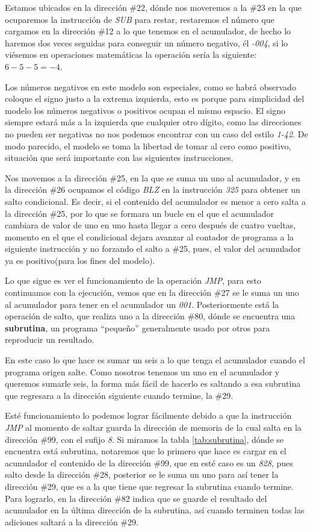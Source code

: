 \documentclass[letterpaper,12pt,oneside]{book}
\begin{document}
	Estamos ubicados en la dirección \#22, dónde nos moveremos a la \#23 en la que ocuparemos la instrucción de \textit{SUB} para restar, restaremos el 
	número que cargamos en la dirección \#12 a lo que tenemos en el acumulador, de hecho lo haremos dos veces seguidas para conseguir un número 	
	negativo, él \textit{-004}, si lo viésemos en operaciones matemáticas la operación sería la siguiente: $ 6-5-5 = -4 $.
 
    Los números negativos en este modelo son especiales, 
	como se habrá observado coloque el signo
	justo a la extrema izquierda, esto es porque para simplicidad del modelo los números negativos
	o positivos ocupan el mismo espacio. El signo siempre estará más a la izquierda que cualquier otro dígito, como las direcciones
	no pueden ser negativas no nos podemos encontrar con un caso del estilo \textit{1-42}. De modo
	parecido, el modelo se toma la libertad de tomar al cero como positivo, situación que será importante con las siguientes instrucciones.
	
	Nos	movemos a la dirección \#25, en la que se suma un uno al acumulador, y en la dirección \#26 ocupamos el código 
	\textit{BLZ} en la instrucción \textit{325} para obtener un salto condicional. Es decir, si el contenido del acumulador es menor a cero salta a la 
	dirección \#25, por lo que se formara
	un bucle en el que el acumulador cambiara de valor de uno en uno hasta llegar a cero después de cuatro vueltas, momento en el que el condicional 
	dejara avanzar al contador de programa a la siguiente instrucción y no forzando el salto a \#25, pues, el valor del acumulador ya es
	positivo(para los fines del modelo).
	
	
	Lo que sigue es ver el funcionamiento de la operación \textit{JMP}, para esto continuamos con la ejecución, vemos que en la dirección
	\#27 se le suma un uno al acumulador para tener en el acumulador un \textit{001}. Posteriormente está la operación
	de salto, que realiza uno a
	la dirección \#80, dónde se encuentra
	una \textbf{subrutina}, un programa ``pequeño'' generalmente usado por otros para reproducir un resultado.
 
    En este caso lo que hace
	es sumar un seis a lo que tenga el acumulador cuando el programa origen salte. Como nosotros tenemos un
	uno en el acumulador y queremos sumarle seis, la forma más fácil de hacerlo es saltando a esa subrutina que regresara a la dirección
	siguiente cuando termine, la \#29.
	
	Esté funcionamiento lo podemos lograr fácilmente debido a que la instrucción \textit{JMP} al momento de saltar guarda la 
	dirección de memoria de la cual salta en la dirección \#99, con el sufijo \textit{8}. Si miramos la tabla \ref{tab:subrutina}, dónde se encuentra
	está subrutina, notaremos que lo primero que hace es cargar en el acumulador el contenido de la dirección \#99, que en
	esté caso es un \textit{828}, pues salto desde la dirección \#28, posterior se le suma un uno
	para así tener la dirección \#29, que es a la que tiene  que regresar la subrutina cuando termine. Para lograrlo, en la dirección
	\#82 indica que se guarde el resultado del acumulador en la última dirección de la subrutina, así cuando terminen todas las adiciones
	saltará a la dirección \#29.
	
\end{document}
